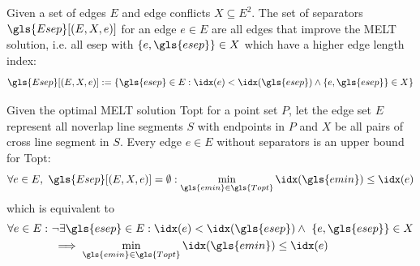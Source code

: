 \begin{definition}[Separators]
  \label{def:separators}
  Given a set of edges \(E\) and edge conflicts \(X \subseteq E^2\). 
  The set of separators \(\gls{Esep}[(E, X, e)]\) for an edge 
  \(e \in E\) are all edges
  that improve the \gls{MELT} solution, i.e. all \gls{esep} with
  \(\{e,\gls{esep}\} \in X\) which have a higher edge length index:
  \[
	  \gls{Esep}[(E,X,e)] := \{
		  \gls{esep} \in E:
		  \idx(e) < \idx(\gls{esep}) \land \{e,\gls{esep}\} \in X
	  \}
  \]
\end{definition}




\begin{theorem}
  \label{thm:upper_bound}
  Given the optimal \gls{MELT} solution \gls{Topt} for a point set
  \(P\), let the edge set \(E\) represent all \gls{noverlap}
  line segments \(S\) with endpoints in \(P\)
  and \(X\) be all pairs of \gls{cross} line segment in \(S\).
  Every edge \(e \in E\) without separators is an upper bound for
  \gls{Topt}:
  \[
    \forall e \in E,~ \gls{Esep}[(E,X,e)] = \emptyset :
    \min\limits_{\gls{emin} \in \gls{Topt}}
    \idx(\gls{emin}) \leq \idx(e)
  \]
  which is equivalent to
  \begin{alignat*}{1}
    \forall e \in E:~ 
    &\lnot\exists \gls{esep} \in E:
    \idx(e) < \idx(\gls{esep})
    \land~ \{e, \gls{esep}\} \in X \\
    &\implies \min\limits_{\gls{emin} \in \gls{Topt}}
    \idx(\gls{emin}) \leq \idx(e)
  \end{alignat*}
\end{theorem}

